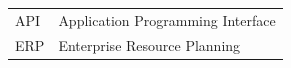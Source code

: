 

\begin{tabular}{@{}p{3cm}l@{}}
API & Application Programming Interface \\
ERP & Enterprise Resource Planning \\
\end{tabular}
